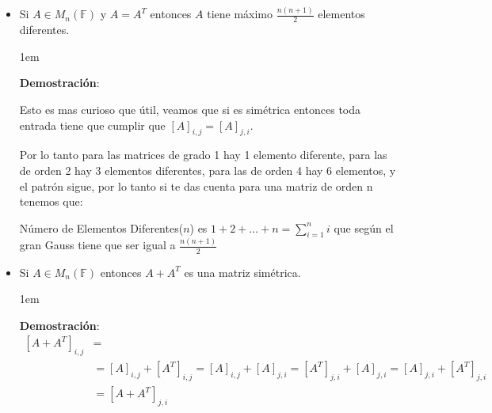 \documentclass[12pt]{report}                                    %
\newenvironment{SmallIndentation}[1][0.75em]                    %
    {\begin{adjustwidth}{#1}{}\begin{footnotesize}}                 %
    {\end{footnotesize}\end{adjustwidth}}                           %
\begin{document}
                    \begin{itemize}

                        \item Si $A \in M_{n}(\mathbb{F})$ y $A = A^T$ entonces $A$ tiene máximo 
                            $\frac{n(n+1)}{2}$ elementos diferentes.

                            \begin{SmallIndentation}[1em]
                                \textbf{Demostración}:

                                Esto es mas curioso que útil, veamos que si es simétrica entonces toda
                                entrada tiene que cumplir que $[A]_{i, j} = [A]_{j,i}$.

                                Por lo tanto para las matrices de grado 1 hay 1 elemento diferente, 
                                para las de orden 2 hay 3 elementos diferentes, para las de orden 4 hay 6
                                elementos, y el patrón sigue, por lo tanto si te das cuenta para 
                                una matriz de orden n tenemos que:

                                Número de Elementos Diferentes($n$) es $1+2+\dots+n = \sum_{i=1}^{n} i$
                                que según el gran Gauss tiene que ser igual a $\frac{n(n+1)}{2}$


                            \end{SmallIndentation}

                        \item Si $A \in M_{n}(\mathbb{F})$ entonces $A+A^T$ es una matriz simétrica. 

                            \begin{SmallIndentation}[1em]
                                \textbf{Demostración}:
                                \begin{equation*}
                                \begin{split}
                                    [A+A^T]_{i,j}   &=                              \\
                                                    &=  [A]_{i,j} + [A^T]_{i,j}    
                                                     =  [A]_{i,j} + [A]_{j,i}    
                                                     =  [A^T]_{j,i} + [A]_{j,i}    
                                                     =  [A]_{j,i} + [A^T]_{j, i}    \\
                                                    &=  [A+A^T]_{j, i}             
                                \end{split}
                                \end{equation*}

                            \end{SmallIndentation}


                    \end{itemize}
\end{document}

